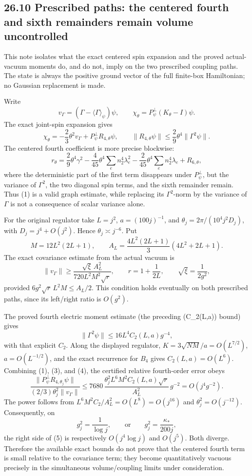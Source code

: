 \documentclass[
  11pt,
]{article}
\begin{document}
\subsection{26.10 Prescribed paths: the centered fourth and sixth
remainders remain volume
uncontrolled}\label{prescribed-paths-the-centered-fourth-and-sixth-remainders-remain-volume-uncontrolled}

This note isolates what the exact centered spin expansion and the proved
actual-vacuum moments do, and do not, imply on the two prescribed
coupling paths. The state is always the positive ground vector of the
full finite-box Hamiltonian; no Gaussian replacement is made.

Write \[
 v_\Gamma=(\Gamma-\langle\Gamma\rangle_\psi)\psi,
 \qquad
 \chi_\theta=P_\psi^\perp(K_\theta-I)\psi .
\] The exact joint-spin expansion gives \[
 \chi_\theta=-\frac23\theta^2v_\Gamma+P_\psi^\perp R_{4,\theta}\psi,
 \qquad
 \|R_{4,\theta}\psi\|\le\frac29\theta^4\|\Gamma^2\psi\| .
 \tag{P1}
\] The centered fourth coefficient is more precise blockwise: \[
 r_\theta=\frac29\theta^4\gamma^2
 -\frac4{45}\theta^4\sum_e n_2^4\lambda_e^2
 -\frac2{45}\theta^4\sum_e n_2^4\lambda_e+R_{6,\theta},
 \tag{P2}
\] where the deterministic part of the first term disappears under
\(P_\psi^\perp\), but the variance of \(\Gamma^2\), the two diagonal
spin terms, and the sixth remainder remain. Thus (1) is a valid graph
estimate, while replacing its \(\Gamma^2\)-norm by the variance of
\(\Gamma\) is not a consequence of scalar variance alone.

For the original regulator take \(L=j^2\), \(a=(100j)^{-1}\), and
\(\theta_j=2\pi/(10^4j^2D_j)\), with \(D_j=j^4+O(j^2)\). Hence
\(\theta_j\asymp j^{-6}\). Put \[
 M=12L^2(2L+1),\qquad
 A_L=\frac{4L^2(2L+1)}3(4L^2+2L+1).
\] The exact covariance estimate from the actual vacuum is \[
 \|v_\Gamma\|\ge
 \frac{\sqrt\xi\,A_L^2}{720L^2M^2\sqrt r},
 \qquad r=1+\frac1{2L},\qquad \sqrt\xi=\frac1{2g^2},
 \tag{P3}
\] provided \(6g^2\sqrt r\,L^2M\le A_L/2\). This condition holds
eventually on both prescribed paths, since its left/right ratio is
\(O(g^2)\).

The proved fourth electric moment estimate (the preceding (C\_2(L,a))
bound) gives \[
 \|\Gamma^2\psi\|\le16L^4C_2(L,a)g^{-4},
 \tag{P4}
\] with that explicit \(C_2\). Along the displayed regulator,
\(K=3\sqrt{NM}/a=O(L^{7/2})\), \(a=O(L^{-1/2})\), and the exact
recurrence for \(B_4\) gives \(C_2(L,a)=O(L^6)\). Combining (1), (3),
and (4), the certified relative fourth-order error obeys \[
 \frac{\|P_\psi^\perp R_{4,\theta_j}\psi\|}
      {(2/3)\theta_j^2\|v_\Gamma\|}
 \le
 7680\,\frac{\theta_j^2L^6M^2C_2(L,a)\sqrt r}{A_L^2}\,g^{-2}
 =O(j^4g^{-2}).
 \tag{P5}
\] The power follows from \(L^6M^2C_2/A_L^2=O(L^8)=O(j^{16})\) and
\(\theta_j^2=O(j^{-12})\). Consequently, on \[
 g_j^2=\frac1{\log j},
 \qquad\text{or}\qquad
 g_j^2=\frac{\kappa_*}{200j},
 \tag{P6}
\] the right side of (5) is respectively \(O(j^4\log j)\) and
\(O(j^5)\). Both diverge. Therefore the available exact bounds do not
prove that the centered fourth term is small relative to the covariance
term; they become quantitatively vacuous precisely in the simultaneous
volume/coupling limits under consideration.
\end{document}

